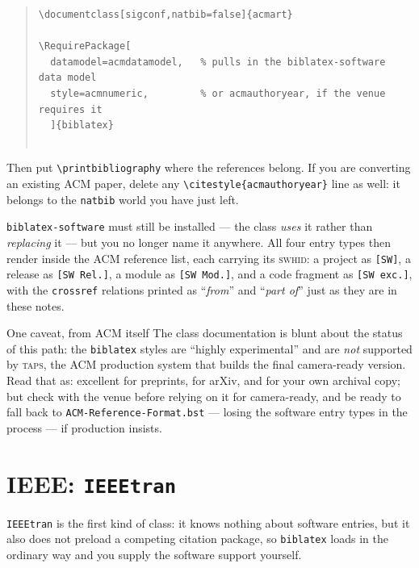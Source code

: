 \begin{quote}\footnotesize
\begin{verbatim}
\documentclass[sigconf,natbib=false]{acmart}

\RequirePackage[
  datamodel=acmdatamodel,   % pulls in the biblatex-software data model
  style=acmnumeric,         % or acmauthoryear, if the venue requires it
  ]{biblatex}


\end{verbatim}
\end{quote}

\noindent Then put \texttt{\textbackslash printbibliography} where the references belong. If you are
converting an existing ACM paper, delete any \texttt{\textbackslash citestyle\{acmauthoryear\}} line
as well: it belongs to the \texttt{natbib} world you have just left.

\texttt{biblatex-software} must still be installed --- the class \emph{uses} it rather than
\emph{replacing} it --- but you no longer name it anywhere. All four entry types then render inside
the ACM reference list, each carrying its \textsc{swhid}: a project as \texttt{[SW]}, a release as
\texttt{[SW Rel.]}, a module as \texttt{[SW Mod.]}, and a code fragment as \texttt{[SW exc.]}, with
the \texttt{crossref} relations printed as \enquote{\emph{from}} and \enquote{\emph{part of}} just as
they are in these notes.

\begin{callout}{One caveat, from ACM itself}
\small The class documentation is blunt about the status of this path: the \texttt{biblatex} styles
are \enquote{highly experimental} and are \emph{not} supported by \textsc{taps}, the ACM production
system that builds the final camera-ready version. Read that as: excellent for preprints, for arXiv,
and for your own archival copy; but check with the venue before relying on it for camera-ready, and
be ready to fall back to \texttt{ACM-Reference-Format.bst} --- losing the software entry types in the
process --- if production insists.
\end{callout}

\section{IEEE: \texttt{IEEEtran}}

\texttt{IEEEtran} is the first kind of class: it knows nothing about software entries, but it also
does not preload a competing citation package, so \texttt{biblatex} loads in the ordinary way and you
supply the software support yourself.

